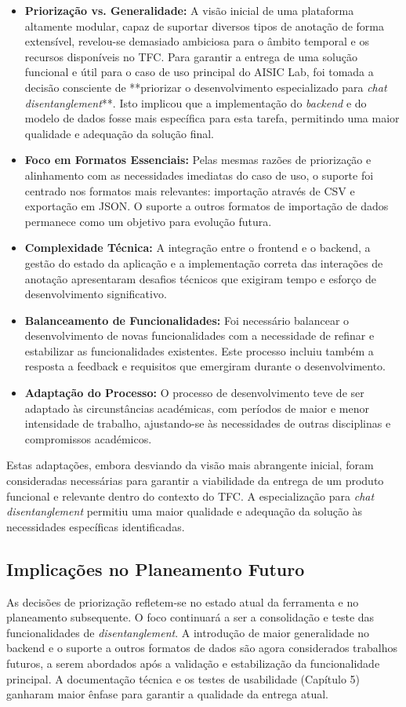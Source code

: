 \begin{itemize}
    \item \textbf{Priorização vs. Generalidade:} A visão inicial de uma plataforma altamente modular, capaz de suportar diversos tipos de anotação de forma extensível, revelou-se demasiado ambiciosa para o âmbito temporal e os recursos disponíveis no TFC. Para garantir a entrega de uma solução funcional e útil para o caso de uso principal do AISIC Lab, foi tomada a decisão consciente de **priorizar o desenvolvimento especializado para \textit{chat disentanglement}**. Isto implicou que a implementação do \textit{backend} e do modelo de dados fosse mais específica para esta tarefa, permitindo uma maior qualidade e adequação da solução final.
    \item \textbf{Foco em Formatos Essenciais:} Pelas mesmas razões de priorização e alinhamento com as necessidades imediatas do caso de uso, o suporte foi centrado nos formatos mais relevantes: importação através de CSV e exportação em JSON. O suporte a outros formatos de importação de dados permanece como um objetivo para evolução futura.
    \item \textbf{Complexidade Técnica:} A integração entre o frontend e o backend, a gestão do estado da aplicação e a implementação correta das interações de anotação apresentaram desafios técnicos que exigiram tempo e esforço de desenvolvimento significativo.
    \item \textbf{Balanceamento de Funcionalidades:} Foi necessário balancear o desenvolvimento de novas funcionalidades com a necessidade de refinar e estabilizar as funcionalidades existentes. Este processo incluiu também a resposta a feedback e requisitos que emergiram durante o desenvolvimento.
    \item \textbf{Adaptação do Processo:} O processo de desenvolvimento teve de ser adaptado às circunstâncias académicas, com períodos de maior e menor intensidade de trabalho, ajustando-se às necessidades de outras disciplinas e compromissos académicos.
\end{itemize}
Estas adaptações, embora desviando da visão mais abrangente inicial, foram consideradas necessárias para garantir a viabilidade da entrega de um produto funcional e relevante dentro do contexto do TFC. A especialização para \textit{chat disentanglement} permitiu uma maior qualidade e adequação da solução às necessidades específicas identificadas.

\subsection{Implicações no Planeamento Futuro}
As decisões de priorização refletem-se no estado atual da ferramenta e no planeamento subsequente. O foco continuará a ser a consolidação e teste das funcionalidades de \textit{disentanglement}. A introdução de maior generalidade no backend e o suporte a outros formatos de dados são agora considerados trabalhos futuros, a serem abordados após a validação e estabilização da funcionalidade principal. A documentação técnica e os testes de usabilidade (Capítulo 5) ganharam maior ênfase para garantir a qualidade da entrega atual.

